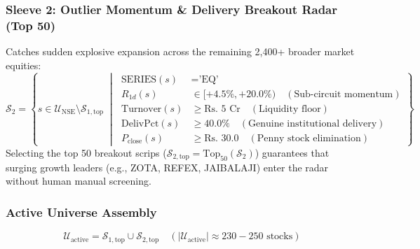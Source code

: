 \documentclass[11pt,a4paper]{article}
\begin{document}
\subsubsection{Sleeve 2: Outlier Momentum \& Delivery Breakout Radar (Top 50)}
Catches sudden explosive expansion across the remaining 2,400+ broader market equities:
\begin{equation}
\mathcal{S}_2 = \left\{ s \in \mathcal{U}_{\text{NSE}} \setminus \mathcal{S}_{1, \text{top}} \;\middle|\;
\begin{aligned}
\text{SERIES}(s) &= \text{'EQ'} \\
R_{1d}(s) &\in [+4.5\%, +20.0\%) \quad (\text{Sub-circuit momentum}) \\
\text{Turnover}(s) &\ge \text{Rs. } 5\text{ Cr} \quad (\text{Liquidity floor}) \\
\text{DelivPct}(s) &\ge 40.0\% \quad (\text{Genuine institutional delivery}) \\
P_{\text{close}}(s) &\ge \text{Rs. } 30.0 \quad (\text{Penny stock elimination})
\end{aligned}
\right\}
\end{equation}
Selecting the top 50 breakout scrips ($\mathcal{S}_{2, \text{top}} = \text{Top}_{50}(\mathcal{S}_2)$) guarantees that surging growth leaders (e.g., ZOTA, REFEX, JAIBALAJI) enter the radar without human manual screening.

\subsubsection{Active Universe Assembly}
\begin{equation}
\mathcal{U}_{\text{active}} = \mathcal{S}_{1, \text{top}} \cup \mathcal{S}_{2, \text{top}} \quad (|\mathcal{U}_{\text{active}}| \approx 230 - 250\text{ stocks})
\end{equation}
\end{document}

